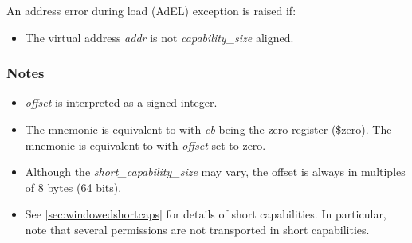 An address error during load (AdEL) exception is raised if:

\begin{itemize}
\item
The virtual address \emph{addr} is not \emph{capability\_size} aligned.
\end{itemize}

\subsubsection*{Notes}

\begin{itemize}
\item
\emph{offset} is interpreted as a signed integer.
\item
The  mnemonic is equivalent to  with
\emph{cb} being the zero register (\$zero). The  mnemonic
is equivalent to  with \emph{offset} set to
zero.
\item
Although the \emph{short\_capability\_size} may vary, the offset is always in
multiples of 8 bytes (64 bits).
\item
See \cref{sec:windowedshortcaps} for details of short capabilities.  In
particular, note that several permissions are not transported in short
capabilities.
\end{itemize}
